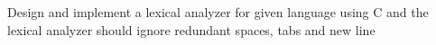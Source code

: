 Design and implement a lexical analyzer for given language using C and the lexical
analyzer should ignore redundant spaces, tabs and new line